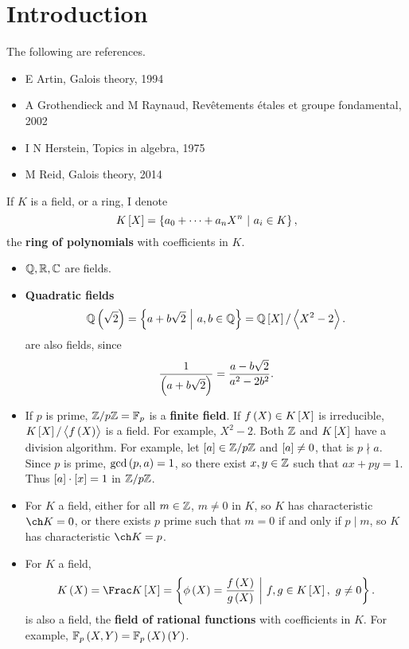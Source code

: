 \section{Introduction}


The following are references.
\begin{itemize}
\item E Artin, Galois theory, 1994
\item A Grothendieck and M Raynaud, Rev\^etements \'etales et groupe fondamental, 2002
\item I N Herstein, Topics in algebra, 1975
\item M Reid, Galois theory, 2014
\end{itemize}

\begin{notation*}
If $ K $ is a field, or a ring, I denote
$$ K\sbr{X} = \cbr{a_0 + \dots + a_nX^n \st a_i \in K}, $$
the \textbf{ring of polynomials} with coefficients in $ K $.
\end{notation*}

\begin{example*}
\hfill
\begin{itemize}
\item $ \mathbb{Q}, \mathbb{R}, \mathbb{C} $ are fields.
\item \textbf{Quadratic fields}
$$ \QQ\br{\sqrt{2}} = \cbr{a + b\sqrt{2} \st a, b \in \QQ} = \QQ\sbr{X} / \abr{X^2 - 2}. $$
are also fields, since
$$ \dfrac{1}{\br{a + b\sqrt{2}}} = \dfrac{a - b\sqrt{2}}{a^2 - 2b^2}. $$
\item If $ p $ is prime, $ \mathbb{Z} / p\mathbb{Z} = \mathbb{F}_p $ is a \textbf{finite field}. If $ f\br{X} \in K\sbr{X} $ is irreducible, $ K\sbr{X} / \abr{f\br{X}} $ is a field. For example, $ X^2 - 2 $. Both $ \mathbb{Z} $ and $ K\sbr{X} $ have a division algorithm. For example, let $ \sbr{a} \in \ZZ / p\ZZ $ and $ \sbr{a} \ne 0 $, that is $ p \nmid a $. Since $ p $ is prime, $ \gcd\br{p, a} = 1 $, so there exist $ x, y \in \mathbb{Z} $ such that $ ax + py = 1 $. Thus $ \sbr{a} \cdot \sbr{x} = 1 $ in $ \mathbb{Z} / p\mathbb{Z} $.
\item For $ K $ a field, either for all $ m \in \mathbb{Z} $, $ m \ne 0 $ in $ K $, so $ K $ has characteristic $ \ch K = 0 $, or there exists $ p $ prime such that $ m = 0 $ if and only if $ p \mid m $, so $ K $ has characteristic $ \ch K = p $.
\item For $ K $ a field,
$$ K\br{X} = \Frac K\sbr{X} = \cbr{\phi\br{X} = \dfrac{f\br{X}}{g\br{X}} \st f, g \in K\sbr{X}, \ g \ne 0}. $$
is also a field, the \textbf{field of rational functions} with coefficients in $ K $. For example, $ \FF_p\br{X, Y} = \FF_p\br{X}\br{Y} $.
\end{itemize}
\end{example*}

